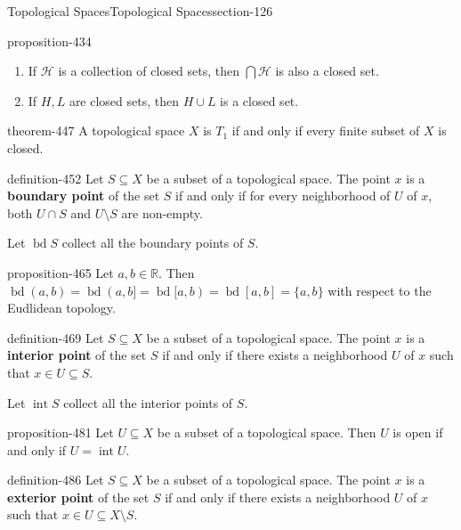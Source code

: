 \documentclass[oneside,10pt,]{article}
\newcommand{\terminology}[1]{\textbf{#1}}
\newcommand{\mb}{\mathbb}
\newcommand{\mc}{\mathcal}
\renewcommand{\int}{\operatorname{int}}
\newcommand{\bd}{\operatorname{bd}}
\begin{document}
\begin{sectionptx}{Topological Spaces}{}{Topological Spaces}{}{}{section-126}
\begin{proposition}{}{}{proposition-434}
\begin{enumerate}
\item\hypertarget{li-441}{}If \(\mc H\) is a collection of closed sets, then \(\bigcap\mc H\) is also a closed set.%
\item\hypertarget{li-444}{}If \(H,L\) are closed sets, then \(H\cup L\) is a closed set.%
\end{enumerate}
\end{proposition}
\begin{theorem}{}{}{theorem-447}%
\hypertarget{p-448}{}%
A topological space \(X\) is \(T_1\) if and only if every finite subset of \(X\) is closed.%
\end{theorem}
\begin{definition}{}{definition-452}%
\hypertarget{p-453}{}%
Let \(S\subseteq X\) be a subset of a topological space. The point \(x\) is a \terminology{boundary point} of the set \(S\) if and only if for every neighborhood of \(U\) of \(x\), both \(U\cap S\) and \(U\setminus S\) are non-empty.%
\par
\hypertarget{p-462}{}%
Let \(\bd S\) collect all the boundary points of \(S\).%
\end{definition}
\begin{proposition}{}{}{proposition-465}%
\hypertarget{p-466}{}%
Let \(a,b\in\mb R\). Then \(\bd (a,b)=\bd (a,b]=\bd [a,b)=\bd [a,b]=\{a,b\}\) with respect to the Eudlidean topology.%
\end{proposition}
\begin{definition}{}{definition-469}%
\hypertarget{p-470}{}%
Let \(S\subseteq X\) be a subset of a topological space. The point \(x\) is a \terminology{interior point} of the set \(S\) if and only if there exists a neighborhood \(U\) of \(x\) such that \(x\in U\subseteq S\).%
\par
\hypertarget{p-478}{}%
Let \(\int S\) collect all the interior points of \(S\).%
\end{definition}
\begin{proposition}{}{}{proposition-481}%
\hypertarget{p-482}{}%
Let \(U\subseteq X\) be a subset of a topological space. Then \(U\) is open if and only if \(U=\int U\).%
\end{proposition}
\begin{definition}{}{definition-486}%
\hypertarget{p-487}{}%
Let \(S\subseteq X\) be a subset of a topological space. The point \(x\) is a \terminology{exterior point} of the set \(S\) if and only if there exists a neighborhood \(U\) of \(x\) such that \(x\in U\subseteq X\setminus S\).%
\par
\hypertarget{p-495}{}%

\end{definition}
\end{sectionptx}
\end{document}
